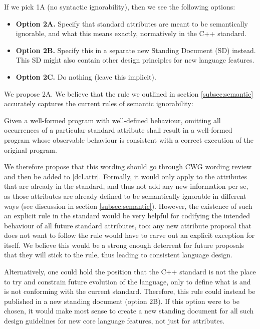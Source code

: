 If we pick 1A (no syntactic ignorability), then we see the following options:

\begin{itemize}
\item \textbf{Option 2A.} Specify that standard attributes are meant to be semantically ignorable, and what this means exactly, normatively in the C++ standard.
\item \textbf{Option 2B.} Specify this in a separate new Standing Document (SD) instead. This SD might also contain other design principles for new language features.
\item \textbf{Option 2C.} Do nothing (leave this implicit).
\end{itemize}

We propose 2A. We believe that the rule we outlined in section \ref{subsec:semantic} accurately captures the current rules of semantic ignorability:
\begin{adjustwidth}{0.5cm}{0.5cm}
Given a well-formed program with well-defined behaviour, omitting all occurrences of a particular standard attribute shall result in a well-formed program whose observable behaviour is consistent with a correct execution of the original program.
\end{adjustwidth}
We therefore propose that this wording should go through CWG wording review and then be added to [dcl.attr]. Formally, it would only apply to the attributes that are already in the standard, and thus not add any new information per se, as those attributes are already defined to be semantically ignorable in different ways (see discussion in section \ref{subsec:semantic}). However, the existence of such an explicit rule in the standard would be very helpful for codifying the intended behaviour of all future standard attributes, too: any new attribute proposal that does not want to follow the rule would have to carve out an explicit exception for itself. We believe this would be a strong enough deterrent for future proposals that they will stick to the rule, thus leading to consistent language design.

Alternatively, one could hold the position that the C++ standard is not the place to try and constrain future evolution of the language, only to define what is and is not conforming with the current standard. Therefore, this rule could instead be published in a new standing document (option 2B). If this option were to be chosen, it would make most sense to create a new standing document for all such design guidelines for new core language features, not just for attributes.

